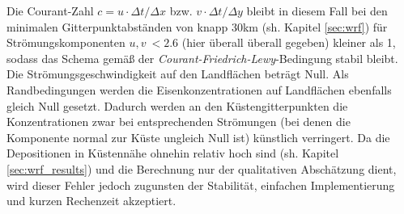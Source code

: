 \documentclass[12pt,a4paper,onecolumn,headheight=30pt]{scrartcl}
\begin{document}
Die Courant-Zahl $c = u \cdot \Delta t / \Delta x$ bzw. $v \cdot \Delta t / \Delta y$ bleibt in diesem Fall bei den minimalen Gitterpunktabständen von knapp 30km (sh. Kapitel \ref{sec:wrf}) für Strömungskomponenten $u,v \ < 2.6$ (hier überall überall gegeben) kleiner als 1, sodass das Schema gemäß der \textit{Courant-Friedrich-Lewy}-Bedingung stabil bleibt. Die Strömungsgeschwindigkeit auf den Landflächen beträgt Null. Als Randbedingungen werden die Eisenkonzentrationen auf Landflächen ebenfalls gleich Null gesetzt. Dadurch werden an den Küstengitterpunkten die Konzentrationen zwar bei entsprechenden Strömungen (bei denen die Komponente normal zur Küste ungleich Null ist) künstlich verringert. Da die Depositionen in Küstennähe ohnehin relativ hoch sind (sh. Kapitel \ref{sec:wrf_results}) und die Berechnung nur der qualitativen Abschätzung dient, wird dieser Fehler jedoch zugunsten der Stabilität, einfachen Implementierung und kurzen Rechenzeit akzeptiert.
\end{document}
